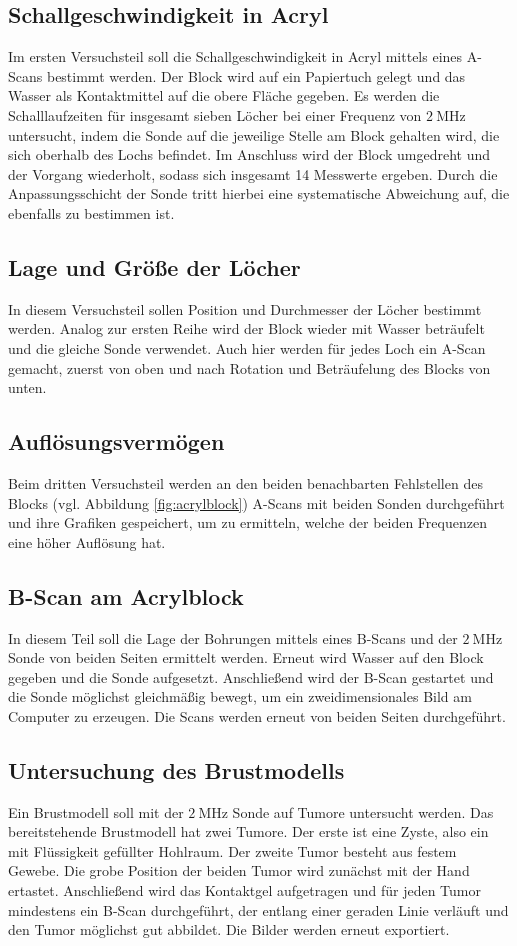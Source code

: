 \subsection{Schallgeschwindigkeit in Acryl}
Im ersten Versuchsteil soll die Schallgeschwindigkeit in Acryl mittels eines A-Scans bestimmt werden.
Der Block wird auf ein Papiertuch gelegt und das Wasser als Kontaktmittel auf die obere Fläche gegeben.
Es werden die Schalllaufzeiten für insgesamt sieben Löcher bei einer Frequenz von $\qty[]{2}{\mega\hertz}$ untersucht, 
indem die Sonde auf die jeweilige Stelle am Block gehalten wird, die sich oberhalb des Lochs befindet. 
Im Anschluss wird der Block umgedreht und der Vorgang wiederholt, sodass sich insgesamt 14 Messwerte ergeben.
Durch die Anpassungsschicht der Sonde tritt hierbei eine systematische Abweichung auf, die ebenfalls zu bestimmen ist.


\subsection{Lage und Größe der Löcher}
In diesem Versuchsteil sollen Position und Durchmesser der Löcher bestimmt werden.
Analog zur ersten Reihe wird der Block wieder mit Wasser beträufelt und die gleiche Sonde verwendet.
Auch hier werden für jedes Loch ein A-Scan gemacht, zuerst von oben und nach Rotation und Beträufelung des Blocks von unten.


\subsection{Auflösungsvermögen}
Beim dritten Versuchsteil werden an den beiden benachbarten Fehlstellen des Blocks (vgl. Abbildung \ref{fig:acrylblock})
A-Scans mit beiden Sonden durchgeführt und ihre Grafiken gespeichert, um zu ermitteln, welche der beiden Frequenzen eine höher Auflösung hat.

\subsection{B-Scan am Acrylblock}
In diesem Teil soll die Lage der Bohrungen mittels eines B-Scans und der $\qty[]{2}{\mega\hertz}$ Sonde von beiden Seiten ermittelt werden.
Erneut wird Wasser auf den Block gegeben und die Sonde aufgesetzt.
Anschließend wird der B-Scan gestartet und die Sonde möglichst gleichmäßig bewegt, um ein zweidimensionales Bild am Computer zu erzeugen.
Die Scans werden erneut von beiden Seiten durchgeführt.

\subsection{Untersuchung des Brustmodells}
Ein Brustmodell soll mit der $\qty[]{2}{\mega\hertz}$ Sonde auf Tumore untersucht werden.
Das bereitstehende Brustmodell hat zwei Tumore.
Der erste ist eine Zyste, also ein mit Flüssigkeit gefüllter Hohlraum.
Der zweite Tumor besteht aus festem Gewebe.
Die grobe Position der beiden Tumor wird zunächst mit der Hand ertastet.
Anschließend wird das Kontaktgel aufgetragen und für jeden Tumor mindestens ein B-Scan durchgeführt, der entlang einer geraden Linie verläuft
und den Tumor möglichst gut abbildet.
Die Bilder werden erneut exportiert.
